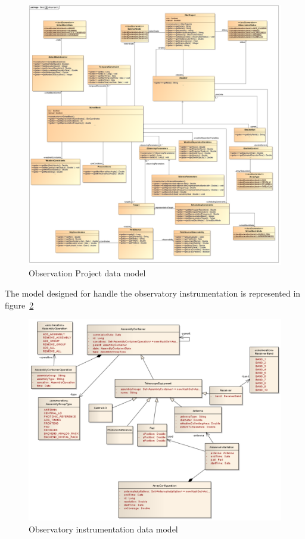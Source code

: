\begin{figure}[h!]	
\begin{center}
\includegraphics[width=1.15\textwidth]{images/Obsproject}
\end{center}
\caption{Observation Project data model}
\label{fig:datamodel-obsproject}
\end{figure}

The model designed for handle the observatory instrumentation is represented in figure~\ref{fig:datamodel-observatory}

\begin{figure}[h!]	
\begin{center}
\includegraphics[width=\textwidth]{images/Observatory}
\end{center}
\caption{Observatory instrumentation data model}
\label{fig:datamodel-observatory}
\end{figure}

